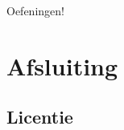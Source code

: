 \documentclass[
    dutch,
    everyoneauthor=true,
    defaultSlideCollection=vincent,
]{../../cursuspresentatie}
\let\placetarget\relax
\begin{document}
\def\placetarget{\hypertarget{oefeningen2}{}}

\begin{frame}
    \begin{center}
        {\LARGE Oefeningen!}
        \vspace{30pt}


        

    \end{center}
\end{frame}

\section{Afsluiting}




% 

% 

% 

% 

% 


% 

\subsection{Licentie}
    
\end{document}
